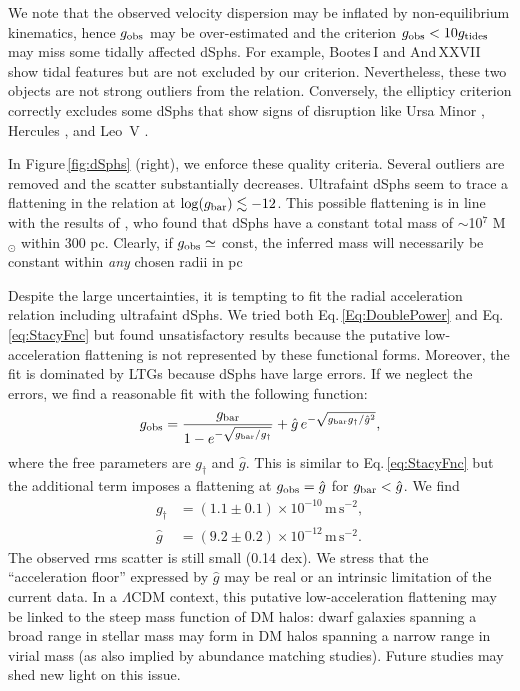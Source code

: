 \documentclass[apjl, twocolappendix]{emulateapj}
\begin{document}
We note that the observed velocity dispersion may be inflated by non-equilibrium kinematics, hence $g_{\rm obs}$ may be over-estimated and the criterion $g_{\rm obs}<10g_{\rm tides}$ may miss some tidally affected dSphs. For example, Bootes\,I \citep{Roderick2016} and And\,XXVII \citep{2013ApJ...768..172C} show tidal features but are not excluded by our criterion. Nevertheless, these two objects are not strong outliers from the relation. Conversely, the ellipticy criterion correctly excludes some dSphs that show signs of disruption like Ursa Minor \citep{Palma2003}, Hercules \citep{Roderick2015}, and Leo~V \citep{Collins2016}.

In Figure\,\ref{fig:dSphs} (right), we enforce these quality criteria. Several outliers are removed and the scatter substantially decreases. Ultrafaint dSphs seem to trace a flattening in the relation at $\log(g_{\rm bar}) \lesssim -12$. This possible flattening is in line with the results of \citet{Strigari2008}, who found that dSphs have a constant total mass of $\sim$10$^{7}$ M$_{\odot}$ within 300 pc. Clearly, if $g_{\rm obs}\simeq$ const, the inferred mass will necessarily be constant within \textit{any} chosen radii in pc \citep[see][for a similar result]{Walker2010}

Despite the large uncertainties, it is tempting to fit the radial acceleration relation including ultrafaint dSphs. We tried both Eq.\,\ref{Eq:DoublePower} and Eq.\,\ref{eq:StacyFnc} but found unsatisfactory results because the putative low-acceleration flattening is not represented by these functional forms. Moreover, the fit is dominated by LTGs because dSphs have large errors. If we neglect the errors, we find a reasonable fit with the following function:
\begin{equation}\label{eq:FedeFnc}
 g_{\rm obs} = \dfrac{g_{\rm bar}}{1 - e^{-\sqrt{g_{\rm bar}/g_\dag} } } + \hat{g}\, e^{-\sqrt{g_{\rm bar} g_\dag/\hat{g}^2}},
\end{equation}
where the free parameters are $g_\dag$ and $\hat{g}$. This is similar to Eq.\,\ref{eq:StacyFnc} but the additional term imposes a flattening at $g_{\rm obs} = \hat{g}$ for $g_{\rm bar} < \hat{g}$. We find
\begin{equation}
\begin{split}
 g_\dag &= (1.1 \pm 0.1) \times 10^{-10} \, \mathrm{m\,s^{-2}},\\
 \hat{g} &= (9.2 \pm 0.2) \times 10^{-12} \, \mathrm{m\,s^{-2}}.
\end{split}
\end{equation}
The observed rms scatter is still small (0.14 dex). We stress that the ``acceleration floor'' expressed by $\hat{g}$ may be real or an intrinsic limitation of the current data. In a $\Lambda$CDM context, this putative low-acceleration flattening may be linked to the steep mass function of DM halos: dwarf galaxies spanning a broad range in stellar mass may form in DM halos spanning a narrow range in virial mass (as also implied by abundance matching studies). Future studies may shed new light on this issue.
\end{document}
